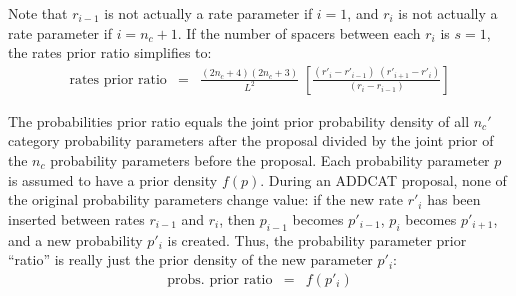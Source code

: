 \documentclass[12pt]{article}
\newcommand{\ncat}{n_c}
\begin{document}
Note that $r_{i-1}$ is not actually a rate parameter if $i=1$, and $r_i$ is not actually a rate parameter if $i=\ncat+1$. If the number of spacers between each $r_i$ is $s=1$, the rates prior ratio simplifies to:
\begin{eqnarray*}
\mbox{rates prior ratio} & = & \frac{(2 \ncat + 4)(2 \ncat + 3)}{L^2} \; 
  \left[ \frac{(r'_i - r'_{i-1}) \; (r'_{i+1} - r'_i)}{(r_i - r_{i-1})} \right]
\end{eqnarray*}

The probabilities prior ratio equals the joint prior probability density of all $\ncat'$ category probability parameters after the proposal divided by the joint prior of the $\ncat$ probability parameters before the proposal. Each probability parameter $p$ is assumed to have a prior density $f(p)$. During an ADDCAT proposal, none of the original probability parameters change value: if the new rate $r'_i$ has been inserted between rates $r_{i-1}$ and $r_i$, then $p_{i-1}$ becomes $p'_{i-1}$, $p_i$ becomes $p'_{i+1}$, and a new probability $p'_i$ is created. Thus, the probability parameter prior ``ratio'' is really just the prior density of the new parameter $p'_i$:
\begin{eqnarray*}
\mbox{probs. prior ratio} & = & f(p'_i)
\end{eqnarray*}
\end{document}
